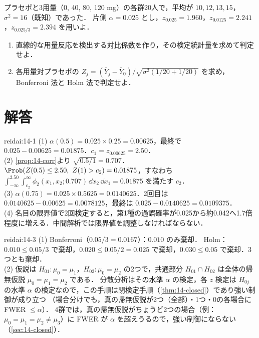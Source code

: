 \begin{reidai}[対比と多重性]\label{reidai:14-4}
プラセボと3用量（0, 40, 80, 120 mg）の各群20人で，平均が $10,12,13,15$，$\sigma^2=16$（既知）であった．
片側 $\alpha=0.025$ とし，$z_{0.025}=1.960$，$z_{0.0125}=2.241$，$z_{0.025/3}=2.394$ を用いよ．
\begin{enumerate}[label=(\arabic*)]
\item 直線的な用量反応を検出する対比係数を作り，その検定統計量を求めて判定せよ．
\item 各用量対プラセボの $Z_j=(\bar Y_j-\bar Y_0)/\sqrt{\sigma^2(1/20+1/20)}$ を求め，Bonferroni 法と Holm 法で判定せよ．
\end{enumerate}
\end{reidai}

\section{解答}\label{sec:14-sol}
\begin{kaitou}{reidai:14-1}
(1) $\alpha(0.5)=0.025\times0.25=0.00625$，最終で $0.025-0.00625=0.01875$．$c_1=z_{0.00625}=2.50$．\\
(2) \cref{prop:14-corr}より $\sqrt{0.5/1}=0.707$．$\Prob(Z(0.5)\le2.50,\ Z(1)>c_2)=0.01875$，すなわち
$\int_{-\infty}^{2.50}\int_{c_2}^{\infty}\phi_2(x_1,x_2;0.707)\,\dd x_2\,\dd x_1=0.01875$ を満たす $c_2$．\\
(3) $\alpha(0.75)=0.025\times0.5625=0.0140625$．2回目は $0.0140625-0.00625=0.0078125$，最終は $0.025-0.0140625=0.0109375$．\\
(4) 名目の限界値で2回検定すると，第1種の過誤確率が0.025から約0.042へ1.7倍程度に増える．中間解析では限界値を調整しなければならない．
\end{kaitou}

\begin{kaitou}{reidai:14-3}
(1) Bonferroni（$0.05/3=0.0167$）：$0.010$ のみ棄却．
Holm：$0.010\le0.05/3$ で棄却，$0.020\le0.05/2=0.025$ で棄却，$0.030\le0.05$ で棄却．3つとも棄却．\\
(2) 仮説は $H_{01}:\mu_0=\mu_1$，$H_{02}:\mu_0=\mu_2$ の2つで，共通部分 $H_{01}\cap H_{02}$ は全体の帰無仮説 $\mu_0=\mu_1=\mu_2$ である．
分散分析はその水準 $\alpha$ の検定，各 $z$ 検定は $H_{0j}$ の水準 $\alpha$ の検定なので，この手順は閉検定手順（\cref{thm:14-closed}）であり強い制御が成り立つ
（場合分けでも，真の帰無仮説が2つ（全部）・1つ・0の各場合に FWER $\le\alpha$）．
4群では，真の帰無仮説がちょうど2つの場合（例：$\mu_0=\mu_1=\mu_2\ne\mu_3$）に FWER が $\alpha$ を超えうるので，強い制御にならない（\cref{sec:14-closed}）．
\end{kaitou}

